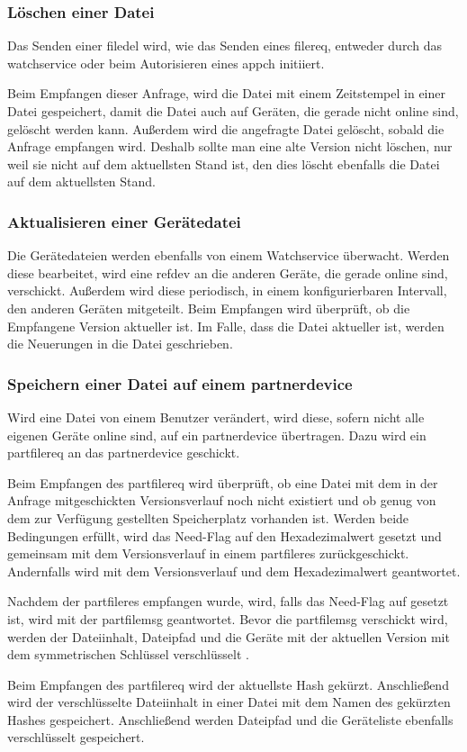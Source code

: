 \subsubsection{Löschen einer Datei}
Das Senden einer \gls{filedel} wird, wie das Senden eines \gls{filereq}, entweder durch das \gls{watchservice} oder beim Autorisieren eines \gls{appch} initiiert. 

Beim Empfangen dieser Anfrage, wird die Datei mit einem Zeitstempel in einer Datei gespeichert, damit die Datei auch auf Geräten, die gerade nicht online sind, gelöscht werden kann. Außerdem wird die angefragte Datei gelöscht, sobald die Anfrage empfangen wird. Deshalb sollte man eine alte Version nicht löschen, nur weil sie nicht auf dem aktuellsten Stand ist, den dies löscht ebenfalls die Datei auf dem aktuellsten Stand.

\subsubsection{Aktualisieren einer Gerätedatei}
Die Gerätedateien werden ebenfalls von einem Watchservice überwacht. Werden diese bearbeitet, wird eine \gls{refdev} an die anderen Geräte, die gerade online sind, verschickt. Außerdem wird diese periodisch, in einem konfigurierbaren Intervall, den anderen Geräten mitgeteilt. Beim Empfangen wird überprüft, ob die Empfangene Version aktueller ist. Im Falle, dass die Datei aktueller ist, werden die Neuerungen in die Datei geschrieben.

\subsubsection{Speichern einer Datei auf einem \gls{partnerdevice}}
Wird eine Datei von einem Benutzer verändert, wird diese, sofern nicht alle eigenen Geräte online sind, auf ein \gls{partnerdevice} übertragen. Dazu wird ein \gls{partfilereq} an das \gls{partnerdevice} geschickt. 

Beim Empfangen des \gls{partfilereq} wird überprüft, ob eine Datei mit dem in der Anfrage mitgeschickten Versionsverlauf noch nicht existiert und ob genug von dem zur Verfügung gestellten Speicherplatz vorhanden ist. Werden beide Bedingungen erfüllt, wird das Need-Flag auf den Hexadezimalwert  gesetzt und gemeinsam mit dem Versionsverlauf in einem \gls{partfileres} zurückgeschickt. Andernfalls wird mit dem Versionsverlauf und dem Hexadezimalwert  geantwortet. 

Nachdem der \gls{partfileres} empfangen wurde, wird, falls das Need-Flag auf  gesetzt ist, wird mit der \gls{partfilemsg} geantwortet. Bevor die \gls{partfilemsg} verschickt wird, werden der Dateiinhalt, Dateipfad und die Geräte mit der aktuellen Version mit dem symmetrischen Schlüssel verschlüsselt .

Beim Empfangen des \gls{partfilereq} wird der aktuellste Hash gekürzt. Anschließend wird der verschlüsselte Dateiinhalt in einer Datei mit dem Namen des gekürzten Hashes gespeichert. Anschließend werden Dateipfad und die Geräteliste ebenfalls verschlüsselt gespeichert.